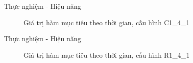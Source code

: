 \begin{frame}{Thực nghiệm - Hiệu năng}
  \begin{figure}
    \centering
    \quad
  \caption{Giá trị hàm mục tiêu theo thời gian, cấu hình C1\_4\_1}
  \end{figure}
\end{frame}

\begin{frame}{Thực nghiệm - Hiệu năng}
  \begin{figure}
    \centering
    \quad
  \caption{Giá trị hàm mục tiêu theo thời gian, cấu hình R1\_4\_1}
  \end{figure}
\end{frame}

